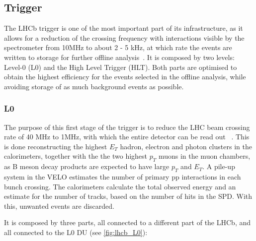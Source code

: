 \subsection{Trigger} 
\label{sec:Trigger}
The LHCb trigger is one of the most important part of its infrastructure, as it allows for a reduction of the crossing frequency with interactions visible by the spectrometer from 10MHz to about 2 - 5 kHz, at which rate the events are written to storage for further offline analysis~\cite{Alves:2008zz}. It is composed by two levels: Level-0 (L0) and the High Level Trigger (HLT). Both parts are optimised to obtain the highest efficiency for the events selected in the offline analysis, while avoiding storage of as much background events as possible. 

\subsubsection{L0}
The purpose of this first stage of the trigger is to reduce the LHC beam crossing rate of 40 MHz to 1MHz, with which the entire detector can be read out ~\cite{Alves:2008zz}. This is done reconstructing the highest $E_T$ hadron, electron and photon clusters in the calorimeters, together with the the two highest $p_T$ muons in the muon chambers, as B meson decay products are expected to have large $p_T$ and $E_T$. A pile-up system in the VELO estimates the number of primary pp interactions in each bunch crossing. The calorimeters calculate the total observed energy and an estimate for the number of tracks, based on the number of hits in the SPD. With this, unwanted events are discarded. 

It is composed by three parts, all connected to a different part of the LHCb, and all connected to the L0 DU (see \ref{fig:lhcb_L0}):


